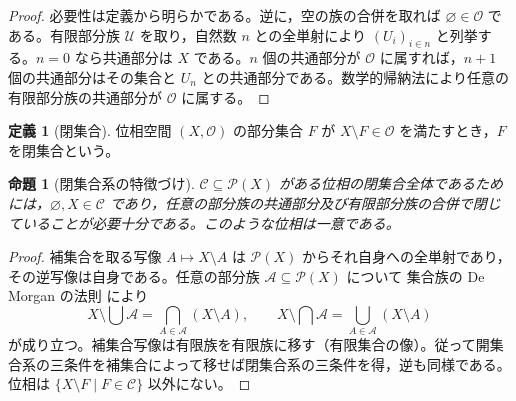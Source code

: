 \documentclass[a5paper,10pt,dvipdfmx]{jsarticle}
\theoremstyle{definition}
\newtheorem{defn}[ruledef]{定義}
\theoremstyle{plain}
\newtheorem{prop}[ruledef]{命題}
\newcommand{\Pow}{\mathcal{P}}
\newcommand{\GenronRefText}[2]{#2}
\begin{document}
\begin{proof}
必要性は定義から明らかである。逆に，空の族の合併を取れば $\varnothing\in\mathcal{O}$ である。有限部分族 $\mathcal U$ を取り，自然数 $n$ との全単射により $(U_i)_{i\in n}$ と列挙する。$n=0$ なら共通部分は $X$ である。$n$ 個の共通部分が $\mathcal{O}$ に属すれば，$n+1$ 個の共通部分はその集合と $U_n$ との共通部分である。\GenronRefText{K-000100}{数学的帰納法}により任意の有限部分族の共通部分が $\mathcal{O}$ に属する。
\end{proof}
\begin{defn}[閉集合]\label{k148}
位相空間 $(X,\mathcal{O})$ の部分集合 $F$ が $X\setminus F\in\mathcal{O}$ を満たすとき，$F$ を閉集合という。
\end{defn}
\begin{prop}[閉集合系の特徴づけ]\label{k149}
$\mathcal C\subseteq\Pow(X)$ がある位相の閉集合全体であるためには，$\varnothing,X\in\mathcal C$ であり，任意の部分族の共通部分及び有限部分族の合併で閉じていることが必要十分である。このような位相は一意である。
\end{prop}
\begin{proof}
補集合を取る写像 $A\mapsto X\setminus A$ は $\Pow(X)$ からそれ自身への全単射であり，その逆写像は自身である。任意の部分族 $\mathcal A\subseteq\Pow(X)$ について \GenronRefText{K-000046}{集合族の De Morgan の法則} により
\[
 X\setminus\bigcup\mathcal A=\bigcap_{A\in\mathcal A}(X\setminus A),\qquad
 X\setminus\bigcap\mathcal A=\bigcup_{A\in\mathcal A}(X\setminus A)
\]
が成り立つ。補集合写像は有限族を有限族に移す（\GenronRefText{K-000113}{有限集合の像}）。従って開集合系の三条件を補集合によって移せば閉集合系の三条件を得，逆も同様である。位相は $\{X\setminus F\mid F\in\mathcal C\}$ 以外にない。
\end{proof}
\end{document}
